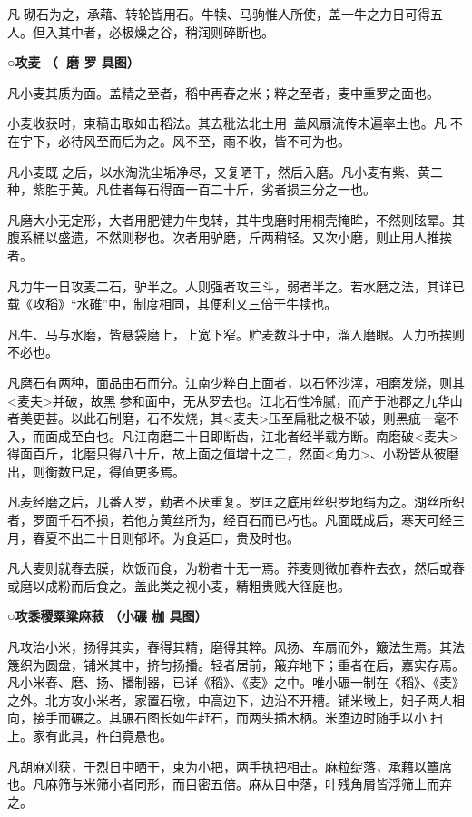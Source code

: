 \documentclass[]{article}
\begin{document}
凡砌石为之，承藉、转轮皆用石。牛犊、马驹惟人所使，盖一牛之力日可得五人。但入其中者，必极燥之谷，稍润则碎断也。

\textbf{○攻麦 （ 磨 罗 具图）}

凡小麦其质为面。盖精之至者，稻中再舂之米；粹之至者，麦中重罗之面也。

小麦收获时，束稿击取如击稻法。其去秕法北土用，盖风扇流传未遍率土也。凡不在宇下，必待风至而后为之。风不至，雨不收，皆不可为也。

凡小麦既之后，以水淘洗尘垢净尽，又复晒干，然后入磨。凡小麦有紫、黄二种，紫胜于黄。凡佳者每石得面一百二十斤，劣者损三分之一也。

凡磨大小无定形，大者用肥健力牛曳转，其牛曳磨时用桐壳掩眸，不然则眩晕。其腹系桶以盛遗，不然则秽也。次者用驴磨，斤两稍轻。又次小磨，则止用人推挨者。

凡力牛一日攻麦二石，驴半之。人则强者攻三斗，弱者半之。若水磨之法，其详已载《攻稻》``水碓''中，制度相同，其便利又三倍于牛犊也。

凡牛、马与水磨，皆悬袋磨上，上宽下窄。贮麦数斗于中，溜入磨眼。人力所挨则不必也。

凡磨石有两种，面品由石而分。江南少粹白上面者，以石怀沙滓，相磨发烧，则其\textless{}麦夫\textgreater{}并破，故黑参和面中，无从罗去也。江北石性冷腻，而产于池郡之九华山者美更甚。以此石制磨，石不发烧，其\textless{}麦夫\textgreater{}压至扁秕之极不破，则黑疵一毫不入，而面成至白也。凡江南磨二十日即断齿，江北者经半载方断。南磨破\textless{}麦夫\textgreater{}得面百斤，北磨只得八十斤，故上面之值增十之二，然面\textless{}角力\textgreater{}、小粉皆从彼磨出，则衡数已足，得值更多焉。

凡麦经磨之后，几番入罗，勤者不厌重复。罗匡之底用丝织罗地绢为之。湖丝所织者，罗面千石不损，若他方黄丝所为，经百石而已朽也。凡面既成后，寒天可经三月，春夏不出二十日则郁坏。为食适口，贵及时也。

凡大麦则就舂去膜，炊饭而食，为粉者十无一焉。荞麦则微加舂杵去衣，然后或舂或磨以成粉而后食之。盖此类之视小麦，精粗贵贱大径庭也。

\textbf{○攻黍稷粟粱麻菽 （小碾 枷 具图）}

凡攻治小米，扬得其实，舂得其精，磨得其粹。风扬、车扇而外，簸法生焉。其法篾织为圆盘，铺米其中，挤匀扬播。轻者居前，簸弃地下；重者在后，嘉实存焉。凡小米舂、磨、扬、播制器，已详《稻》、《麦》之中。唯小碾一制在《稻》、《麦》之外。北方攻小米者，家置石墩，中高边下，边沿不开槽。铺米墩上，妇子两人相向，接手而碾之。其碾石图长如牛赶石，而两头插木柄。米堕边时随手以小扫上。家有此具，杵臼竟悬也。

凡胡麻刈获，于烈日中晒干，束为小把，两手执把相击。麻粒绽落，承藉以簟席也。凡麻筛与米筛小者同形，而目密五倍。麻从目中落，叶残角屑皆浮筛上而弃之。
\end{document}
